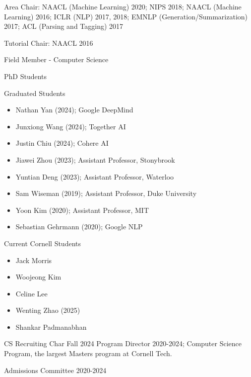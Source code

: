 \documentclass[10pt]{article}
\begin{document}
{\ind Area Chair:
\ind NAACL (Machine Learning) 2020; NIPS 2018; NAACL (Machine Learning) 2016; ICLR (NLP) 2017, 2018; EMNLP (Generation/Summarization) 2017; ACL (Parsing and Tagging) 2017

\ind Tutorial Chair: NAACL 2016

\bigskip

\medskip

\ind Field Member - Computer Science

\ind PhD Students


\ind Graduated Students

\begin{itemize}
	\item Nathan Yan (2024); Google DeepMind
	\item Junxiong Wang (2024); Together AI
	\item Justin Chiu (2024); Cohere AI
	\item Jiawei Zhou (2023); Assistant Professor, Stonybrook
	\item Yuntian Deng (2023); Assistant Professor, Waterloo
	\item Sam Wiseman (2019); Assistant Professor, Duke University
	\item Yoon Kim (2020); Assistant Professor, MIT
	\item Sebastian Gehrmann (2020); Google NLP

\end{itemize}


\ind Current Cornell Students

\begin{itemize}
	\item Jack Morris
	\item Woojeong Kim
	\item Celine Lee
	\item Wenting Zhao (2025)
	\item Shankar Padmanabhan
\end{itemize}


\medskip
\ind CS Recruiting Char Fall 2024
\ind Program Director 2020-2024; Computer Science Program, the largest Masters program at Cornell Tech.

\ind Admissions Committee 2020-2024
\bigskip



}
\end{document}
